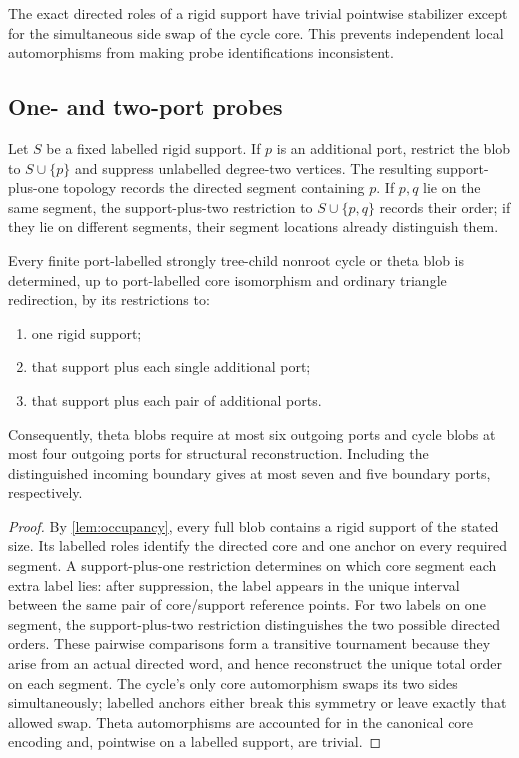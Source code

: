 The exact directed roles of a rigid support have trivial pointwise stabilizer except for the simultaneous side swap of the cycle core.  This prevents independent local automorphisms from making probe identifications inconsistent.

\subsection{One- and two-port probes}

Let $S$ be a fixed labelled rigid support.  If $p$ is an additional port, restrict the blob to $S\cup\{p\}$ and suppress unlabelled degree-two vertices.  The resulting support-plus-one topology records the directed segment containing $p$.  If $p,q$ lie on the same segment, the support-plus-two restriction to $S\cup\{p,q\}$ records their order; if they lie on different segments, their segment locations already distinguish them.

\begin{theorem}\label{thm:bounded-support}
Every finite port-labelled strongly tree-child nonroot cycle or theta blob is determined, up to port-labelled core isomorphism and ordinary triangle redirection, by its restrictions to:
\begin{enumerate}[label=\textup{(\roman*)}]
\item one rigid support;
\item that support plus each single additional port;
\item that support plus each pair of additional ports.
\end{enumerate}
Consequently, theta blobs require at most six outgoing ports and cycle blobs at most four outgoing ports for structural reconstruction.  Including the distinguished incoming boundary gives at most seven and five boundary ports, respectively.
\end{theorem}

\begin{proof}
By \cref{lem:occupancy}, every full blob contains a rigid support of the stated size.  Its labelled roles identify the directed core and one anchor on every required segment.  A support-plus-one restriction determines on which core segment each extra label lies: after suppression, the label appears in the unique interval between the same pair of core/support reference points.  For two labels on one segment, the support-plus-two restriction distinguishes the two possible directed orders.  These pairwise comparisons form a transitive tournament because they arise from an actual directed word, and hence reconstruct the unique total order on each segment.  The cycle's only core automorphism swaps its two sides simultaneously; labelled anchors either break this symmetry or leave exactly that allowed swap.  Theta automorphisms are accounted for in the canonical core encoding and, pointwise on a labelled support, are trivial.
\end{proof}

